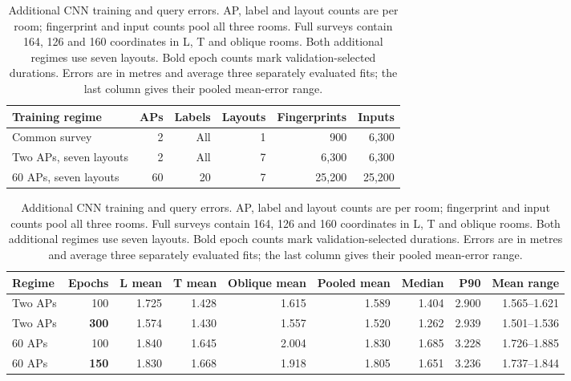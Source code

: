\begin{table}[H]
\centering\small
\caption{Additional CNN training and query errors. AP, label and layout counts are per room; fingerprint and input counts pool all three rooms. Full surveys contain 164, 126 and 160 coordinates in L, T and oblique rooms. Both additional regimes use seven layouts. Bold epoch counts mark validation-selected durations. Errors are in metres and average three separately evaluated fits; the last column gives their pooled mean-error range.}
\label{tab:cnnbudget}
\setlength{\tabcolsep}{4pt}
\begin{tabular}{lrrrrr}
\toprule
Training regime & APs & Labels & Layouts & Fingerprints & Inputs\\
\midrule
Common survey & 2 & All & 1 & 900 & 6,300\\
Two APs, seven layouts & 2 & All & 7 & 6,300 & 6,300\\
60 APs, seven layouts & 60 & 20 & 7 & 25,200 & 25,200\\
\bottomrule
\end{tabular}
\par\medskip
\setlength{\tabcolsep}{3.5pt}
\begin{tabular}{lrrrrrrrr}
\toprule
Regime & Epochs & L mean & T mean & Oblique mean & Pooled mean & Median & P90 & Mean range\\
\midrule
Two APs & 100 & 1.725 & 1.428 & 1.615 & 1.589 & 1.404 & 2.900 & 1.565--1.621\\
Two APs & \textbf{300} & 1.574 & 1.430 & 1.557 & 1.520 & 1.262 & 2.939 & 1.501--1.536\\
60 APs & 100 & 1.840 & 1.645 & 2.004 & 1.830 & 1.685 & 3.228 & 1.726--1.885\\
60 APs & \textbf{150} & 1.830 & 1.668 & 1.918 & 1.805 & 1.651 & 3.236 & 1.737--1.844\\
\bottomrule
\end{tabular}
\end{table}
